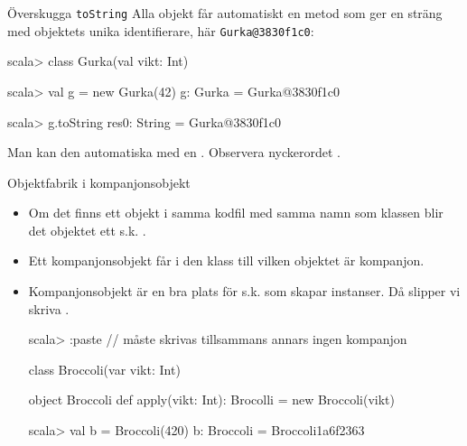 \begin{Slide}{Överskugga \texttt{toString}}
Alla objekt får automatiskt en metod  som ger en sträng med objektets unika identifierare, här \texttt{Gurka@3830f1c0}:
\begin{REPL}
scala> class Gurka(val vikt: Int) 

scala> val g = new Gurka(42)
g: Gurka = Gurka@3830f1c0

scala> g.toString
res0: String = Gurka@3830f1c0
\end{REPL}
Man kan  den automatiska   med en . Observera nyckerordet .
\end{Slide}





\begin{Slide}{Objektfabrik i kompanjonsobjekt}%
\begin{itemize}
\item Om det finns ett objekt i samma kodfil med samma namn som klassen blir det objektet ett s.k.   .

\item Ett kompanjonsobjekt får  i den klass till vilken objektet är kompanjon.

\item Kompanjonsobjekt är en bra plats för s.k.  som skapar instanser. Då slipper vi skriva .
\begin{REPL}
scala> :paste   // måste skrivas tillsammans annars ingen kompanjon

class Broccoli(var vikt: Int) 

object Broccoli {
  def apply(vikt: Int): Brocolli = new Broccoli(vikt)
}

scala> val b = Broccoli(420)
b: Broccoli = Broccoli1a6f2363
\end{REPL}

\end{itemize}
\end{Slide}


